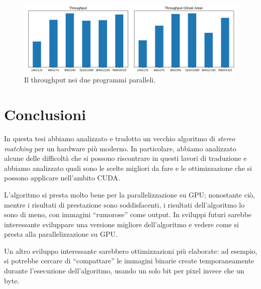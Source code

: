 \documentclass[12pt,a4paper,openright,twoside]{report}
\begin{document}
\begin{figure}[h]
    \centering
    \includegraphics[width=\textwidth]{throughput.png}
    \caption{Il throughput nei due programmi paralleli.}
    \label{}
\end{figure}

\chapter*{Conclusioni}



In questa tesi abbiamo analizzato e tradotto un vecchio algoritmo di \textit{stereo matching} per un hardware più moderno. In particolare, abbiamo analizzato alcune delle difficoltà che si possono riscontrare in questi lavori di traduzione e abbiamo analizzato quali sono le scelte migliori da fare e le ottimizzazione che si possono applicare nell'ambito CUDA.

L'algoritmo si presta molto bene per la parallelizzazione su GPU; nonostante ciò, mentre i risultati di prestazione sono soddisfacenti, i risultati dell'algoritmo lo sono di meno, con immagini ``rumorose'' come output. In sviluppi futuri sarebbe interessante sviluppare una versione migliore dell'algoritmo e vedere come si presta alla parallelizzazione su GPU.

Un altro sviluppo interessante sarebbero ottimizzazioni più elaborate: ad esempio, si potrebbe cercare di ``compattare'' le immagini binarie create temporaneamente durante l'esecuzione dell'algoritmo, usando un solo bit per pixel invece che un byte.

\clearpage{\pagestyle{empty}\cleardoublepage}




\end{document}
